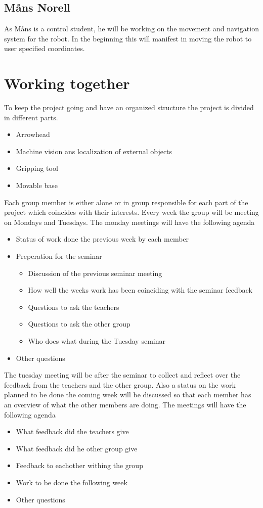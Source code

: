 \subsection{Måns Norell}
As Måns is a control student, he will be working on the movement and navigation system for the robot. In the beginning this will manifest in moving the robot to user specified coordinates.

\section{Working together}
To keep the project going and have an organized structure the project is divided 
in different parts. 
\begin{itemize}
    \item Arrowhead
    \item Machine vision ans localization of external objects
    \item Gripping tool
    \item Movable base
\end{itemize}
Each group member is either alone or in group responsible for each part of the 
project which coincides with their interests. 
Every week the group will be meeting on Mondays and Tuesdays. 
The monday meetings will have the following agenda 
\begin{itemize}
    \item Status of work done the previous week by each member
    \item Preperation for the seminar
    \begin{itemize}
        \item Discussion of the previous seminar meeting
        \item How well the weeks work has been coinciding with the seminar feedback
        \item Questions to ask the teachers
        \item Questions to ask the other group
        \item Who does what during the Tuesday seminar
    \end{itemize}
    \item Other questions
\end{itemize}
The tuesday meeting will be after the seminar to collect and reflect over the 
feedback from the teachers and the other group. Also a status on the work planned to be done 
the coming week will be discussed so that each member has an overview of what 
the other members are doing. The meetings will have the following agenda
\begin{itemize}
    \item What feedback did the teachers give
    \item What feedback did he other group give 
    \item Feedback to eachother withing the group
    \item Work to be done the following week
    \item Other questions
\end{itemize}









